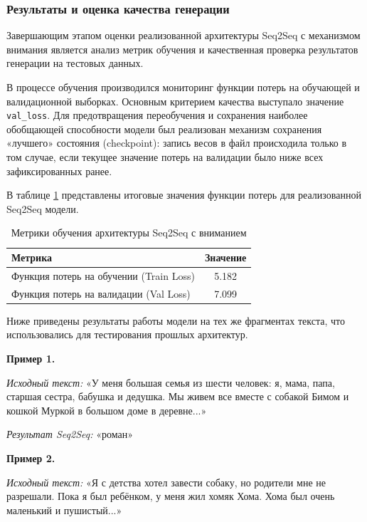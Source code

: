 \documentclass[coursework]{SCWorks}
\begin{document}
    \subsubsection{Результаты и оценка качества генерации}

    Завершающим этапом оценки реализованной архитектуры Seq2Seq с механизмом внимания является анализ метрик обучения и качественная проверка результатов генерации на тестовых данных.

    В процессе обучения производился мониторинг функции потерь на обучающей и валидационной выборках. Основным критерием качества выступало значение \texttt{val\_loss}. Для предотвращения переобучения и сохранения наиболее обобщающей способности модели был реализован механизм сохранения «лучшего» состояния (checkpoint): запись весов в файл происходила только в том случае, если текущее значение потерь на валидации было ниже всех зафиксированных ранее.

    В таблице \ref{tab:seq2seq_metrics} представлены итоговые значения функции потерь для реализованной Seq2Seq модели.

    \begin{table}[h!]
        \centering
        \caption{Метрики обучения архитектуры Seq2Seq с вниманием}
        \label{tab:seq2seq_metrics}
        \begin{tabular}{|l|c|}
            \hline
            \textbf{Метрика}                        & \textbf{Значение} \\ \hline
            Функция потерь на обучении (Train Loss) & 5.182             \\ \hline
            Функция потерь на валидации (Val Loss)  & 7.099             \\ \hline
        \end{tabular}
    \end{table}

    Ниже приведены результаты работы модели на тех же фрагментах текста, что использовались для тестирования прошлых архитектур.

    \textbf{Пример 1.}

    \textit{Исходный текст:} «У меня большая семья из шести человек: я, мама, папа, старшая сестра, бабушка и дедушка. Мы живем все вместе с собакой Бимом и кошкой Муркой в большом доме в деревне...»

    \textit{Результат Seq2Seq:} «роман»

    \textbf{Пример 2.}

    \textit{Исходный текст:} «Я с детства хотел завести собаку, но родители мне не разрешали. Пока я был ребёнком, у меня жил хомяк Хома. Хома был очень маленький и пушистый...»
\end{document}
